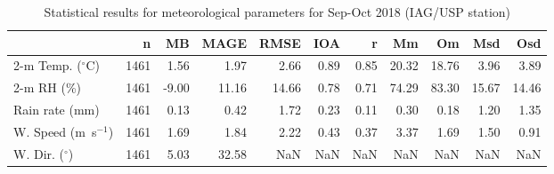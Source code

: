\begin{table}
\centering
\caption{Statistical results for meteorological parameters for Sep-Oct 2018 (IAG/USP station)}
\label{tab:stats_iag}
\begin{tabular}{lrrrrrrrrrr}
\toprule
{} &     n &    MB &   MAGE &   RMSE &   IOA &     r &     Mm &     Om &    Msd &    Osd \\
\midrule
2-m Temp. ($^{\circ}$C) &  1461 &  1.56 &   1.97 &   2.66 &  0.89 &  0.85 &  20.32 &  18.76 &   3.96 &   3.89 \\
2-m RH (\%) &  1461 & -9.00 &  11.16 &  14.66 &  0.78 &  0.71 &  74.29 &  83.30 &  15.67 &  14.46 \\
Rain rate (mm) &  1461 &  0.13 &   0.42 &   1.72 &  0.23 &  0.11 &   0.30 &   0.18 &   1.20 &   1.35 \\
W. Speed (m~s$^{-1}$)&  1461 &  1.69 &   1.84 &   2.22 &  0.43 &  0.37 &   3.37 &   1.69 &   1.50 &   0.91 \\
W. Dir. ($^{\circ}$) &  1461 &  5.03 &  32.58 &    NaN &   NaN &   NaN &    NaN &    NaN &    NaN &    NaN \\
\bottomrule
\end{tabular}
\end{table}

